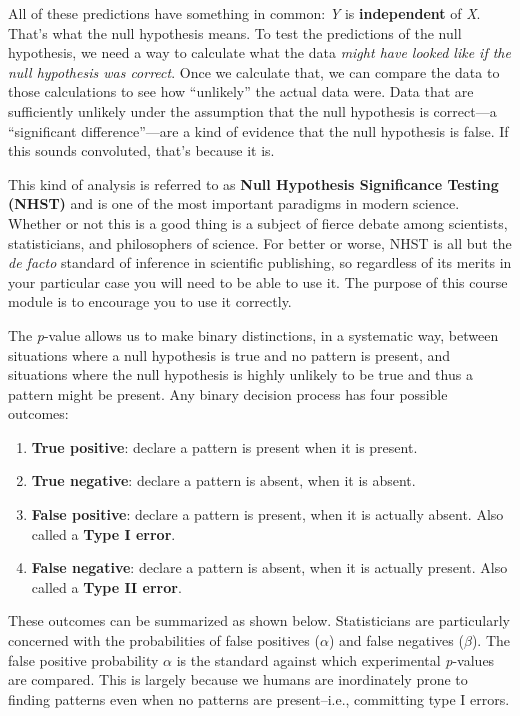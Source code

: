 \documentclass[
  13,
  letterpaper,
]{report}
\providecommand{\tightlist}{%
  \setlength{\itemsep}{0pt}\setlength{\parskip}{0pt}}
\begin{document}
All of these predictions have something in common: \emph{Y} is
\textbf{independent} of \emph{X}. That's what the null hypothesis means.
To test the predictions of the null hypothesis, we need a way to
calculate what the data \emph{might have looked like if the null
hypothesis was correct}. Once we calculate that, we can compare the data
to those calculations to see how ``unlikely'' the actual data were. Data
that are sufficiently unlikely under the assumption that the null
hypothesis is correct---a ``significant difference''---are a kind of
evidence that the null hypothesis is false. If this sounds convoluted,
that's because it is.

This kind of analysis is referred to as \textbf{Null Hypothesis
Significance Testing (NHST)} and is one of the most important paradigms
in modern science. Whether or not this is a good thing is a subject of
fierce debate among scientists, statisticians, and philosophers of
science. For better or worse, NHST is all but the \emph{de facto}
standard of inference in scientific publishing, so regardless of its
merits in your particular case you will need to be able to use it. The
purpose of this course module is to encourage you to use it correctly.

The \emph{p}-value allows us to make binary distinctions, in a
systematic way, between situations where a null hypothesis is true and
no pattern is present, and situations where the null hypothesis is
highly unlikely to be true and thus a pattern might be present. Any
binary decision process has four possible outcomes:

\begin{enumerate}
\def\labelenumi{\arabic{enumi}.}
\tightlist
\item
  \textbf{True positive}: declare a pattern is present when it is
  present.
\item
  \textbf{True negative}: declare a pattern is absent, when it is
  absent.
\item
  \textbf{False positive}: declare a pattern is present, when it is
  actually absent. Also called a \textbf{Type I error}.
\item
  \textbf{False negative}: declare a pattern is absent, when it is
  actually present. Also called a \textbf{Type II error}.
\end{enumerate}

These outcomes can be summarized as shown below. Statisticians are
particularly concerned with the probabilities of false positives
(\(\alpha\)) and false negatives (\(\beta\)). The false positive
probability \(\alpha\) is the standard against which experimental
\emph{p}-values are compared. This is largely because we humans are
inordinately prone to finding patterns even when no patterns are
present--i.e., committing type I errors.
\end{document}
